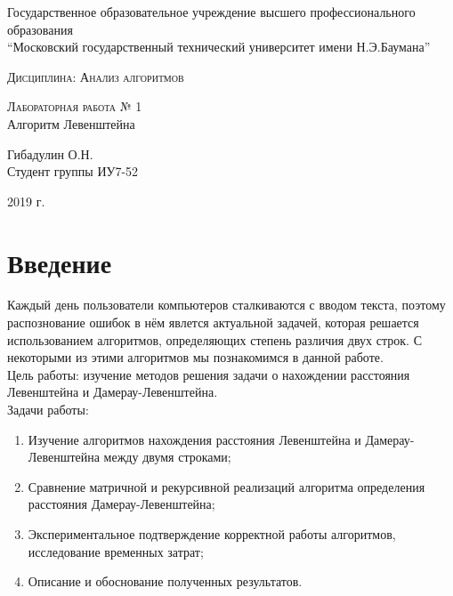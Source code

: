 \documentclass[a4paper, 14pt]{article}
\begin{document}
	\begin{titlepage}
		\begin{center}
			\large
			Государственное образовательное учреждение высшего профессионального образования\\
			“Московский государственный технический университет имени Н.Э.Баумана”
			\vspace{0.25cm}
			
			
			\textsc{Дисциплина: Анализ алгоритмов}\\[5mm]
			\vfill
			
			\textsc{Лабораторная работа № 1}\\[5mm]
			
			{\LARGE Алгоритм Левенштейна}
			\bigskip
			
			
			Гибадулин О.Н.\\
			Студент группы ИУ7-52
			\vfill		
			
		\end{center}
		\begin{center}
			2019 г.
		\end{center}
	\end{titlepage}

	\newpage

	\tableofcontents
	
	\newpage
	\section*{Введение}
	
	Каждый день пользователи компьютеров сталкиваются с вводом текста, поэтому распознование ошибок в нём явлется актуальной задачей, которая решается использованием алгоритмов, определяющих степень различия двух строк. С некоторыми из этими алгоритмов мы познакомимся в данной работе.\\
	
	Цель работы: изучение методов решения задачи о нахождении расстояния Левенштейна и Дамерау-Левенштейна. \\
	
	Задачи работы:
	
	\begin{enumerate}
		\item {Изучение алгоритмов нахождения расстояния Левенштейна и Дамерау-Левенштейна между двумя строками;}
		\item {Сравнение матричной и рекурсивной реализаций алгоритма определения расстояния Дамерау-Левенштейна;}
		\item {Экспериментальное подтверждение корректной работы алгоритмов, исследование временных затрат;}
		\item {Описание и обоснование полученных результатов.}
	\end{enumerate}
	
\end{document}
